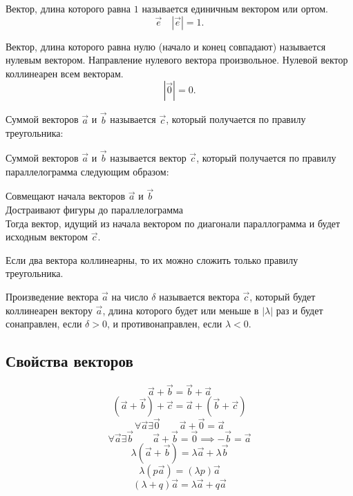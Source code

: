 \begin{definition}
  Вектор, длина которого равна $1$ называется единичным вектором или ортом.
  \[
    \vec{e} \quad |\vec{e}| = 1 
  .\] 
\end{definition}

\begin{definition}
  Вектор, длина которого равна нулю (начало и конец совпадают) называется нулевым вектором. Направление нулевого вектора произвольное. Нулевой вектор коллинеарен всем векторам.
  \[
    |\vec{0}| = 0
  .\] 
\end{definition}

\begin{definition}
  Суммой векторов $\vec{a}$ и $\vec{b}$ называется $\vec{c}$, который получается по правилу треугольника:
\end{definition}

\begin{definition}
  Суммой векторов $$ и $$ называется вектор $$, который получается по правилу параллелограмма следующим образом:
  \begin{enumerate}
    Совмещают начала векторов $$ и $$ \\
    Достраивают фигуры до параллелограмма \\
    Тогда вектор, идущий из начала вектором по диагонали параллограмма и будет исходным вектором $$.
  \end{enumerate}
\end{definition}

\begin{note}
  Если два вектора коллинеарны, то их можно сложить только правилу треугольника.
\end{note}

\begin{definition}
  Произведение вектора $$ на число $\delta$ называется вектора $$, который будет коллинеарен вектору $$, длина которого будет или меньше в $|\lambda|$ раз и будет сонаправлен, если $\delta > 0$, и противонаправлен, если $\lambda < 0$.
\end{definition}

\subsection{Свойства векторов}
\[
  \vec{a} + \vec{b} = \vec{b} + \vec{a}
\]\[
  (\vec{a} + \vec{b}) + \vec{c} = \vec{a} + (\vec{b} + \vec{c})
\]\[
  \forall \vec{a} \exists \vec{0} \qquad \vec{a} + \vec{0} = \vec{a}
\]\[
  \forall \vec{a} \exists \vec{b} \qquad \vec{a} + \vec{b} = \vec{0} \implies -\vec{b} = \vec{a}
\]\[
  \lambda\left( \vec{a} + \vec{b} \right) = \lambda \vec{a} + \lambda \vec{b}
\]\[
  \lambda(p \vec{a}) = \left( \lambda p \right) \vec{a}
\]\[
  \left( \lambda  + q\right) \vec{a} = \lambda \vec{a} + q \vec{a} 
\]

